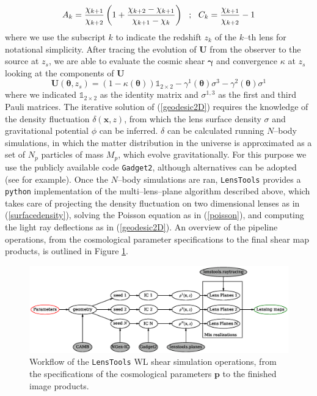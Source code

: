 \documentclass[reprint,aps,prd,superscriptaddress,showkeys,showpacs]{revtex4-1}
\newcommand{\bb}[1]{\mathbf{#1}}
\newcommand{\ttt}[1]{\texttt{#1}}
\newcommand{\LT}{\texttt{LensTools} }
\begin{document}
\begin{equation}
A_k = \frac{\chi_{k+1}}{\chi_{k+2}}\left(1 + \frac{\chi_{k+2}-\chi_{k+1}}{\chi_{k+1}-\chi_k}\right) \,\,\,\, ; \,\,\,\, C_k = \frac{\chi_{k+1}}{\chi_{k+2}} - 1 \\ \\
\end{equation} 
%
where we use the subscript $k$ to indicate the redshift $z_k$ of the $k$--th lens for notational simplicity. After tracing the evolution of $\bb{U}$ from the observer to the source at $z_s$, we are able to evaluate the cosmic shear $\pmb{\gamma}$ and convergence $\kappa$ at $z_s$ looking at the components of $\bb{U}$
\begin{equation}
\bb{U}(\pmb{\theta},z_s) = (1-\kappa(\pmb{\theta}))\mathds{1}_{2\times2} - \gamma^1(\pmb{\theta})\sigma^3 - \gamma^2(\pmb{\theta})\sigma^1
\end{equation}
%
where we indicated $\mathds{1}_{2\times2}$ as the identity matrix and $\sigma^{1,3}$ as the first and third Pauli matrices. The iterative solution of (\ref{geodesic2D}) requires the knowledge of the density fluctuation $\delta(\bb{x},z)$, from which the lens surface density $\sigma$ and gravitational potential $\phi$ can be inferred. $\delta$ can be calculated running $N$--body simulations, in which the matter distribution in the universe is approximated as a set of $N_p$ particles of mass $M_p$, which evolve gravitationally. For this purpose we use the publicly available code \ttt{Gadget2}\citep{Gadget2}, although alternatives can be adopted (see \citep{HACC} for example). Once the $N$--body simulations are ran, \LT provides a \ttt{python} implementation of the multi--lens--plane algorithm \citep{RayTracingHartlap} described above, which takes care of projecting the density fluctuation on two dimensional lenses as in (\ref{surfacedensity}), solving the Poisson equation as in (\ref{poisson}), and computing the light ray deflections as in (\ref{geodesic2D}). An overview of the pipeline operations, from the cosmological parameter specifications to the final shear map products, is outlined in Figure \ref{pipescheme}. 


\begin{figure}
\includegraphics[scale=0.6]{Figures/flow.eps}
\caption{Workflow of the \LT WL shear simulation operations, from the specifications of the cosmological parameters $\bb{p}$ to the finished image products.}
\label{pipescheme}
\end{figure}
\end{document}
